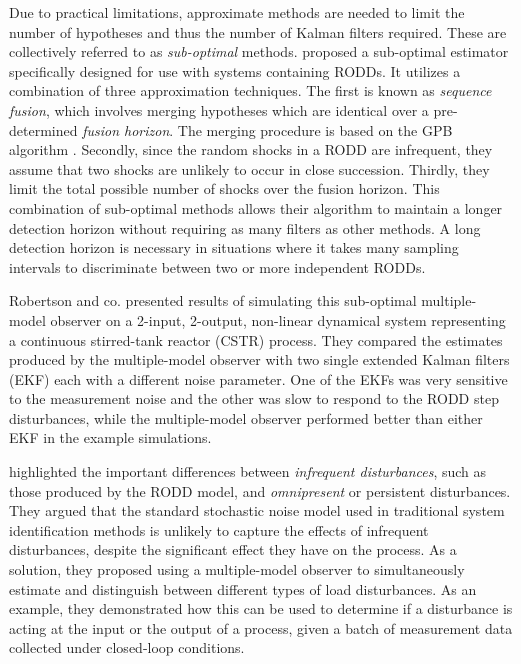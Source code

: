 Due to practical limitations, approximate methods are needed to limit the number of hypotheses and thus the number of Kalman filters required. These are collectively referred to as \textit{sub-optimal} methods. \cite{robertson_detection_1995} proposed a sub-optimal estimator specifically designed for use with systems containing \gls{RODD}s. It utilizes a combination of three approximation techniques. The first is known as \textit{sequence fusion}, which involves merging hypotheses which are identical over a pre-determined \textit{fusion horizon}. The merging procedure is based on the \gls{GPB} algorithm \citep{buxbaum_recursive_1969, jaffer_estimation_1971, tugnait_detection_1982, gustafsson_estimation_1993}. Secondly, since the random shocks in a \gls{RODD} are infrequent, they assume that two shocks are unlikely to occur in close succession. Thirdly, they limit the total possible number of shocks over the fusion horizon. This combination of sub-optimal methods allows their algorithm to maintain a longer detection horizon without requiring as many filters as other methods. A long detection horizon is necessary in situations where it takes many sampling intervals to discriminate between two or more independent \gls{RODD}s.

Robertson and co. presented results of simulating this sub-optimal multiple-model observer on a 2-input, 2-output, non-linear dynamical system representing a continuous stirred-tank reactor (CSTR) process. They compared the estimates produced by the multiple-model observer with two single extended Kalman filters (\acrshort{EKF}) each with a different noise parameter. One of the \gls{EKF}s was very sensitive to the measurement noise and the other was slow to respond to the \gls{RODD} step disturbances, while the multiple-model observer performed better than either \gls{EKF} in the example simulations.

\cite{eriksson_classification_1996} highlighted the important differences between \textit{infrequent disturbances}, such as those produced by the \gls{RODD} model, and \textit{omnipresent} or persistent disturbances. They argued that the standard stochastic noise model used in traditional system identification methods is unlikely to capture the effects of infrequent disturbances, despite the significant effect they have on the process. As a solution, they proposed using a multiple-model observer to simultaneously estimate and distinguish between different types of load disturbances. As an example, they demonstrated how this can be used to determine if a disturbance is acting at the input or the output of a process, given a batch of measurement data collected under closed-loop conditions.

